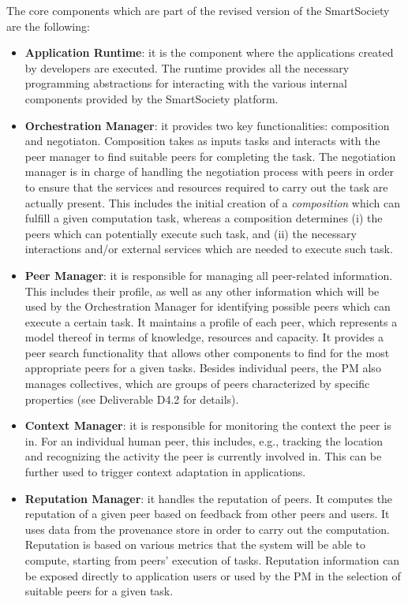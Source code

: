 The core components which are part of the revised version of the SmartSociety are the following:
\begin{itemize}
\item \textbf{Application Runtime}: it is the component where the applications created by developers are executed. The runtime provides all the necessary programming abstractions for interacting with the various internal components provided by the SmartSociety platform. 

\item \textbf{Orchestration Manager}: it provides two key functionalities: composition and negotiaton. Composition takes as
inputs tasks and interacts with the peer manager to find suitable peers for completing the task. The negotiation manager is in charge of handling the negotiation process with peers in order to ensure that the services and resources required to carry out the task are actually present. This includes the initial creation of a \textit{composition} which can fulfill a given computation task, whereas a composition determines (i) the peers which can potentially execute such task, and (ii) the necessary interactions and/or external services which are needed to execute such task. 

\item \textbf{Peer Manager}: it is responsible for managing all peer-related information. This includes their profile, as well as any other information which will be used by the Orchestration Manager for identifying possible peers which can execute a certain task.  It maintains a profile of each peer, which
represents a model thereof in terms of knowledge, resources and
capacity. It provides a peer search functionality that allows other
components to find for the most appropriate peers for a given tasks.  Besides individual peers, the PM also manages collectives, which are groups of peers characterized by specific properties (see Deliverable D4.2 for details).

\item \textbf{Context Manager}: it is responsible for monitoring the context the peer is in. For an individual human peer, this includes, e.g., tracking the location and recognizing the activity the peer is currently involved in. This can be further used to trigger context adaptation in applications. 

\item \textbf{Reputation Manager}: it handles the reputation of peers. It computes the reputation of a given peer based on feedback from other peers and users. It uses data from the provenance store in order to carry out the computation. Reputation is based on various metrics that the system will be able to compute, starting from peers' execution of tasks. Reputation information can be exposed directly to application users or used by the PM in the selection of suitable peers for a given task.


\end{itemize}
